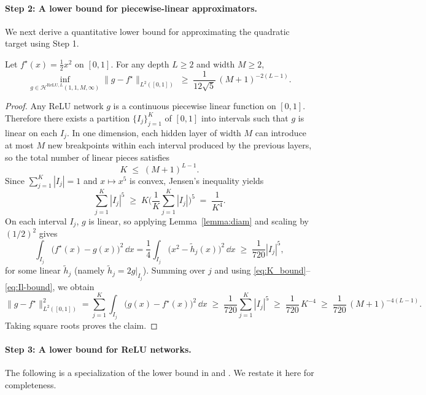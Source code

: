 \documentclass[11pt]{article}
\begin{document}
\paragraph{Step 2: A lower bound for piecewise-linear approximators.}

We next derive a quantitative lower bound for approximating the quadratic target using Step 1.

\begin{lemma}
\label{lem:lower_bound}
Let $f^\star(x)=\tfrac12 x^2$ on $[0,1]$. For any depth $L\ge 2$ and width $M\ge 2$,
\[
\inf_{g\in \mathcal{H}^{\mathrm{ReLU},L}(1,1,M,\infty)}
\|g-f^\star\|_{L^2([0,1])}
\;\ge\;
\frac{1}{12\sqrt{5}}\,(M+1)^{-2(L-1)}.
\]
\end{lemma}

\begin{proof}
Any ReLU network $g$ is a continuous piecewise linear function on $[0,1]$. Therefore there exists
a partition $\{I_j\}_{j=1}^K$ of $[0,1]$ into intervals such that $g$ is linear on each $I_j$.
In one dimension, each hidden layer of width $M$ can introduce at most $M$ new breakpoints within
each interval produced by the previous layers, so the total number of linear pieces satisfies
\begin{equation}
K \;\le\; (M+1)^{L-1}.
\label{eq:K_bound}
\end{equation}
Since $\sum_{j=1}^K |I_j|=1$ and $x\mapsto x^5$ is convex, Jensen's inequality yields
\begin{equation}
\sum_{j=1}^K |I_j|^5 \;\ge\; K\Big(\frac{1}{K}\sum_{j=1}^K |I_j|\Big)^5 \;=\; \frac{1}{K^4}.
\label{eq:Il-bound}
\end{equation}
On each interval $I_j$, $g$ is linear, so applying Lemma~\ref{lemma:diam} and scaling by $(1/2)^2$
gives
\[
\int_{I_j}\big(f^\star(x)-g(x)\big)^2\,\dd x
=\frac14\int_{I_j}\big(x^2-\tilde h_j(x)\big)^2\,\dd x
\;\ge\;\frac{1}{720}|I_j|^5,
\]
for some linear $\tilde h_j$ (namely $\tilde h_j=2g|_{I_j}$). Summing over $j$ and using
\eqref{eq:K_bound}--\eqref{eq:Il-bound}, we obtain
\[
\|g-f^\star\|_{L^2([0,1])}^2
=\sum_{j=1}^K\int_{I_j}\big(g(x)-f^\star(x)\big)^2\,\dd x
\;\ge\;\frac{1}{720}\sum_{j=1}^K |I_j|^5
\;\ge\;\frac{1}{720}\,K^{-4}
\;\ge\;\frac{1}{720}\,(M+1)^{-4(L-1)}.
\]
Taking square roots proves the claim.
\end{proof}

\paragraph{Step 3: A lower bound for ReLU networks.}
The following is a specialization of the lower bound in \citet{lu2021deep} and \citet{siegel2023optimal}. We restate it here for completeness.
\end{document}

